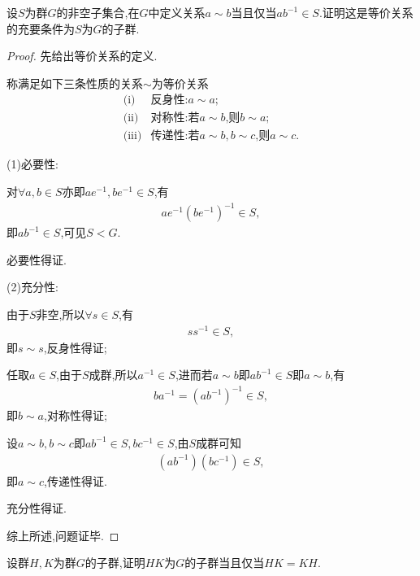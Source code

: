 \begin{problem}[P54T9]
    设$S$为群$G$的非空子集合,在$G$中定义关系$a\sim b$当且仅当$ab^{-1}\in S$.证明这是等价关系的充要条件为$S$为$G$的子群.
\end{problem}
\begin{proof}
    先给出等价关系的定义.
    
    称满足如下三条性质的关系$\sim$为等价关系\begin{align*}
        \text{(i)}&\text{反身性:$a\sim a$;}\\
        \text{(ii)}&\text{对称性:若$a\sim b$,则$b\sim a$;}\\
        \text{(iii)}&\text{传递性:若$a\sim b,b\sim c$,则$a\sim c$.}
    \end{align*}

    (1)必要性:

    对$\forall a,b\in S$亦即$ae^{-1},be^{-1}\in S$,有\begin{align*}
        ae^{-1}(be^{-1})^{-1}\in S,
    \end{align*}即$ab^{-1}\in S$,可见$S<G$.
    
    必要性得证.

    (2)充分性:

    由于$S$非空,所以$\forall s\in S$,有\begin{align*}
        ss^{-1}\in S,
    \end{align*}即$s\sim s$,反身性得证;

    任取$a\in S$,由于$S$成群,所以$a^{-1}\in S$,进而若$a\sim b$即$ab^{-1}\in S$即$a\sim b$,有\begin{align*}
    ba^{-1}=(ab^{-1})^{-1}\in S,
    \end{align*}即$b\sim a$,对称性得证;

    设$a\sim b,b\sim c$即$ab^{-1}\in S,bc^{-1}\in S$,由$S$成群可知\begin{align*}
    (ab^{-1})(bc^{-1})\in S,
    \end{align*}即$a\sim c$,传递性得证.

    充分性得证.

    综上所述,问题证毕.
\end{proof}
\begin{problem}[P55T20]
    设群$H,K$为群$G$的子群,证明$HK$为$G$的子群当且仅当$HK=KH$.
\end{problem}
